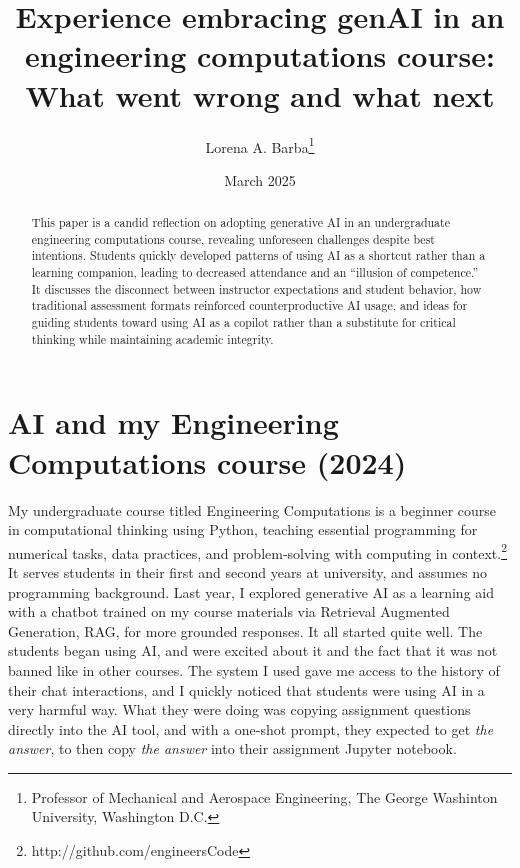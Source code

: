 \documentclass{tufte-handout}
\title{Experience embracing genAI in an engineering computations course: What went wrong and what next}
\author[lab]{Lorena A. Barba\thanks{Professor of Mechanical and Aerospace Engineering, The George Washinton University, Washington D.C.}}
\date{March 2025}  %
\begin{document}
\maketitle%

\begin{abstract}
\noindent This paper is a candid reflection on adopting generative AI in an undergraduate engineering computations course, revealing unforeseen challenges despite best intentions. Students quickly developed patterns of using AI as a shortcut rather than a learning companion, leading to decreased attendance and an ``illusion of competence.'' It discusses the disconnect between instructor expectations and student behavior, how traditional assessment formats reinforced counterproductive AI usage, and ideas for guiding students toward using AI as a copilot rather than a substitute for critical thinking while maintaining academic integrity.
\end{abstract}


\section{AI and my Engineering Computations course (2024)}\label{sec:engcomp}

My undergraduate course titled Engineering Computations is a beginner course in computational thinking using Python, teaching essential programming for numerical tasks, data practices, and problem-solving with computing in context.\footnote{http://github.com/engineersCode} 
It serves students in their first and second years at university, and assumes no programming background.\cite{barba2025syll}
Last year, I explored generative AI as a learning aid with a chatbot trained on my course materials via Retrieval Augmented Generation, RAG, for more grounded responses. It all started quite well. The students began using AI, and were excited about it and the fact that it was not banned like in other courses. The system I used\cite{barba2024pres} gave me access to the history of their chat interactions, and I quickly noticed that students were using AI in a very harmful way. What they were doing was copying assignment questions directly into the AI tool, and with a one-shot prompt, they expected to get \emph{the answer}, to then copy \emph{the answer} into their assignment Jupyter notebook. 
\end{document}

